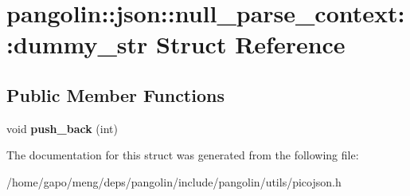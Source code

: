 \hypertarget{structpangolin_1_1json_1_1null__parse__context_1_1dummy__str}{}\section{pangolin\+:\+:json\+:\+:null\+\_\+parse\+\_\+context\+:\+:dummy\+\_\+str Struct Reference}
\label{structpangolin_1_1json_1_1null__parse__context_1_1dummy__str}
\subsection*{Public Member Functions}
\begin{DoxyCompactItemize}
\item 
void {\bfseries push\+\_\+back} (int)\hypertarget{structpangolin_1_1json_1_1null__parse__context_1_1dummy__str_a699530fb46d1c188e5e5ced1020b6607}{}\label{structpangolin_1_1json_1_1null__parse__context_1_1dummy__str_a699530fb46d1c188e5e5ced1020b6607}

\end{DoxyCompactItemize}


The documentation for this struct was generated from the following file\+:\begin{DoxyCompactItemize}
\item 
/home/gapo/meng/deps/pangolin/include/pangolin/utils/picojson.\+h\end{DoxyCompactItemize}
